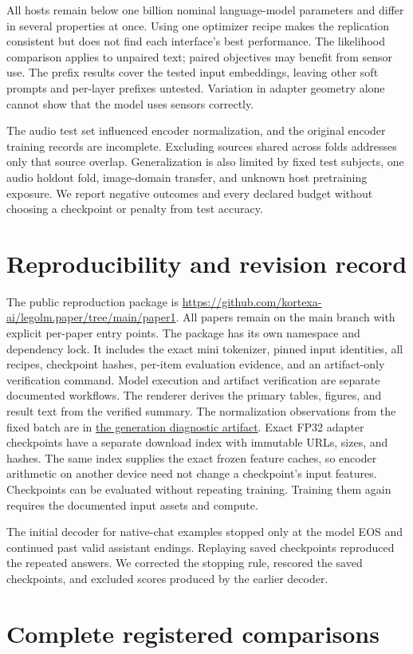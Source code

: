 \documentclass[11pt]{article}
\begin{document}
All hosts remain below one billion nominal language-model parameters and differ
in several properties at once. Using one optimizer recipe makes the replication
consistent but does not find each interface's best performance. The likelihood
comparison applies to unpaired text; paired objectives may benefit from sensor
use. The prefix results cover the tested input embeddings, leaving other soft
prompts and per-layer prefixes untested. Variation in adapter geometry alone
cannot show that the model uses sensors correctly.

The audio test set influenced encoder normalization, and the original encoder
training records are incomplete. Excluding sources shared across folds addresses
only that source overlap. Generalization is also limited by fixed test subjects,
one audio holdout fold, image-domain transfer, and unknown host pretraining
exposure. We report negative outcomes and every declared budget without choosing
a checkpoint or penalty from test accuracy.

\section{Reproducibility and revision record}
The public reproduction package is
\url{https://github.com/kortexa-ai/legolm.paper/tree/main/paper1}.
All papers remain on the main branch with explicit per-paper entry points.
The package has its own namespace and dependency lock. It includes the exact
mini tokenizer, pinned input identities, all recipes, checkpoint hashes,
per-item evaluation evidence, and an artifact-only verification command.
Model execution and artifact verification are separate documented workflows.
The renderer derives the primary tables, figures, and result text from the
verified summary. The normalization observations from the fixed batch are in
\href{https://github.com/kortexa-ai/legolm.paper/blob/main/paper1/artifacts/revision-2/diagnostics/g-audio-normalization.json}{the generation diagnostic artifact}. Exact FP32 adapter checkpoints have a separate
download index with immutable URLs, sizes, and hashes. The same index supplies
the exact frozen feature caches, so encoder arithmetic on another device need
not change a checkpoint's input features. Checkpoints can be evaluated without
repeating training. Training them again requires the documented input assets and compute.

The initial decoder for native-chat examples stopped only at the model EOS and
continued past valid assistant endings. Replaying saved checkpoints reproduced
the repeated answers. We corrected the stopping rule, rescored the saved
checkpoints, and excluded scores produced by the earlier decoder.





\clearpage
\appendix
\section{Complete registered comparisons}

\end{document}
